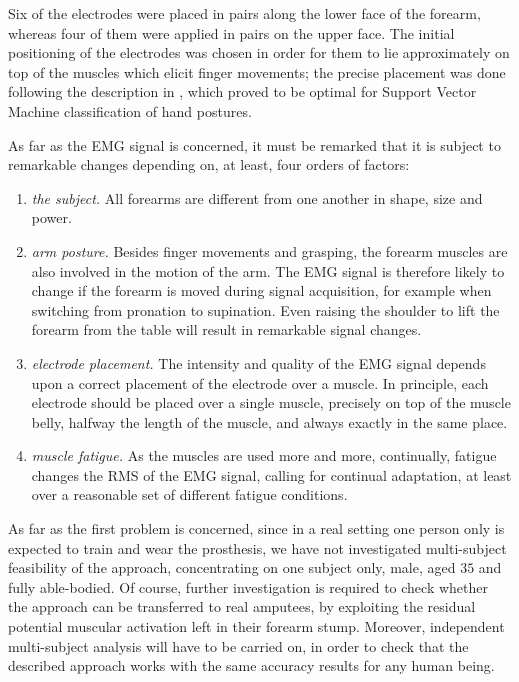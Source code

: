 Six of the electrodes were placed in pairs along the lower face of the
forearm, whereas four of them were applied in pairs on the upper
face. The initial positioning of the electrodes was chosen in order
for them to lie approximately on top of the muscles which elicit
finger movements; the precise placement was done following the
description in \cite{smagt}, which proved to be optimal for Support
Vector Machine classification of hand postures.

As far as the EMG signal is concerned, it must be remarked that it is
subject to remarkable changes depending on, at least, four orders of
factors:

\begin{enumerate}

  \item \emph{the subject.} All forearms are different from one
    another in shape, size and power.

  \item \emph{arm posture.} Besides finger movements and grasping, the
    forearm muscles are also involved in the motion of the arm. The
    EMG signal is therefore likely to change if the forearm is moved
    during signal acquisition, for example when switching from
    pronation to supination. Even raising the shoulder to lift the
    forearm from the table will result in remarkable signal changes.

  \item \emph{electrode placement.} The intensity and quality of the
    EMG signal depends upon a correct placement of the electrode over
    a muscle. In principle, each electrode should be placed over a
    single muscle, precisely on top of the muscle belly, halfway the
    length of the muscle, and always exactly in the same place.

  \item \emph{muscle fatigue.} As the muscles are used more and more,
    continually, fatigue changes the RMS of the EMG signal, calling
    for continual adaptation, at least over a reasonable set of
    different fatigue conditions.

\end{enumerate}

As far as the first problem is concerned, since in a real setting one
person only is expected to train and wear the prosthesis, we have not
investigated multi-subject feasibility of the approach, concentrating
on one subject only, male, aged $35$ and fully able-bodied. Of course,
further investigation is required to check whether the approach can be
transferred to real amputees, by exploiting the residual potential
muscular activation left in their forearm stump. Moreover, independent
multi-subject analysis will have to be carried on, in order to check
that the described approach works with the same accuracy results for
any human being.

